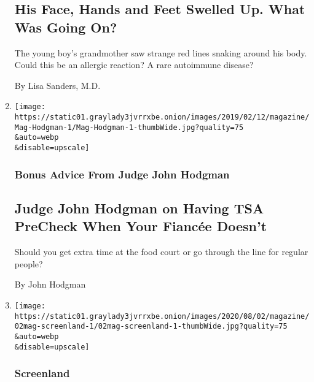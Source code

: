 \begin{enumerate}
  \hypertarget{his-face-hands-and-feet-swelled-up-what-was-going-on}{%
  \subsection{His Face, Hands and Feet Swelled Up. What Was Going
  On?}\label{his-face-hands-and-feet-swelled-up-what-was-going-on}}

  The young boy's grandmother saw strange red lines snaking around his
  body. Could this be an allergic reaction? A rare autoimmune disease?

  By Lisa Sanders, M.D.
\item
  \href{/2020/07/30/magazine/judge-john-hodgman-on-having-tsa-precheck-when-your-fiancee-doesnt.html}{}

  \texttt{[image: https://static01.graylady3jvrrxbe.onion/images/2019/02/12/magazine/Mag-Hodgman-1/Mag-Hodgman-1-thumbWide.jpg?quality=75\\\&auto=webp\\\&disable=upscale]}

  \hypertarget{bonus-advice-from-judge-john-hodgman}{%
  \subsubsection{Bonus Advice From Judge John
  Hodgman}\label{bonus-advice-from-judge-john-hodgman}}

  \hypertarget{judge-john-hodgman-on-having-tsa-precheck-when-your-fiancuxe9e-doesnt}{%
  \subsection{Judge John Hodgman on Having TSA PreCheck When Your
  Fiancée
  Doesn't}\label{judge-john-hodgman-on-having-tsa-precheck-when-your-fiancuxe9e-doesnt}}

  Should you get extra time at the food court or go through the line for
  regular people?

  By John Hodgman
\item
  \href{/2020/07/29/magazine/i-may-destroy-you-hbo-michaela-coel.html}{}

  \texttt{[image: https://static01.graylady3jvrrxbe.onion/images/2020/08/02/magazine/02mag-screenland-1/02mag-screenland-1-thumbWide.jpg?quality=75\\\&auto=webp\\\&disable=upscale]}

  \hypertarget{screenland}{%
  \subsubsection{Screenland}\label{screenland}}


\end{enumerate}
